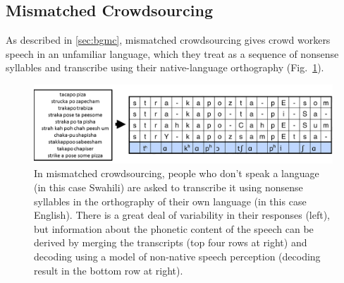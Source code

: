 \subsection{Mismatched Crowdsourcing}
\label{sec:MC}

As described in \ref{sec:bgmc}, mismatched crowdsourcing gives crowd
workers speech in an unfamiliar language, which they treat as a sequence
of nonsense syllables and transcribe using their native-language 
orthography (Fig.~\ref{fig:mc}).

\begin{figure}
  \centerline{\includegraphics[width=5in]{../figs/fig_jyothi.png}}
  \caption{In mismatched crowdsourcing, people who don't speak a
    language (in this case Swahili) are asked to transcribe it using
    nonsense syllables in the orthography of their own language (in
    this case English).  There is a great deal of variability in their
    responses (left), but information about the phonetic content of
    the speech can be derived by merging the transcripts (top four
    rows at right) and decoding using a model of non-native speech
    perception (decoding result in the bottom row at right).}
  \label{fig:mc}
\end{figure}

